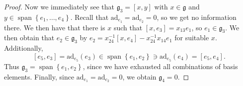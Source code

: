 \documentclass[11pt, letterpaper]{article}
\theoremstyle{plain}
\begin{document}
\begin{proof}
	Now we immediately see that $\mathfrak{g} _3 = [x,y]$ with $x\in \mathfrak{g} $ and $y\in \operatorname{span} \left\{ e_1, \ldots ,e_4 \right\} $. Recall that $\mathrm{ad} _{e_1} =\mathrm{ad} _{e_2} =0$, so we get no information there. We then have that there is $x$ such that $[x,e_3]=x_{13} e_1$, so $e_1\in \mathfrak{g} _3$. We then obtain that $e_2\in \mathfrak{g} _3$ by $e_2 = x_{24} ^{-1} [x,e_4] - x_{24} ^{-1} x_{14} e_1$ for suitable $x$. Additionally, 
	\[
		[e_5,e_3] = \mathrm{ad}_{e_5} (e_3)\in \operatorname{span} \left\{ e_1,e_2 \right\} \ni \mathrm{ad}_{e_5} (e_4) = [e_5,e_4]
	.\]
	Thus $\mathfrak{g} _3 = \operatorname{span} \left\{ e_1,e_2 \right\} $, since we have exhausted all combinations of basis elements. Finally, since $\mathrm{ad} _{e_1} =\mathrm{ad} _{e_2} =0$, we obtain $\mathfrak{g} _4=0$.
\end{proof}
\end{document}
